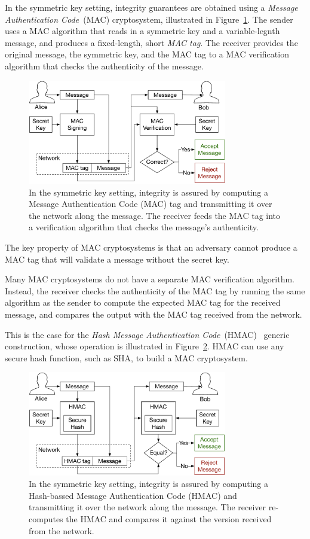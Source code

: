 In the symmetric key setting, integrity guarantees are obtained using a
\textit{Message Authentication Code}~(MAC) cryptosystem, illustrated in
Figure~\ref{fig:symmetric_mac}. The sender uses a MAC algorithm that reads in a
symmetric key and a variable-legnth message, and produces a fixed-length, short
\textit{MAC tag}. The receiver provides the original message, the symmetric
key, and the MAC tag to a MAC verification algorithm that checks the
authenticity of the message.

\begin{figure}[hbt]
  \centering
  \includegraphics[width=87mm]{figures/symmetric_mac.pdf}
  \caption{
    In the symmetric key setting, integrity is assured by computing a
    Message Authentication Code (MAC) tag and transmitting it over the network
    along the message. The receiver feeds the MAC tag into a verification
    algorithm that checks the message's authenticity.
  }
  \label{fig:symmetric_mac}
\end{figure}

The key property of MAC cryptosystems is that an adversary cannot produce a
MAC tag that will validate a message without the secret key.

Many MAC cryptosystems do not have a separate MAC verification algorithm.
Instead, the receiver checks the authenticity of the MAC tag by running the
same algorithm as the sender to compute the expected MAC tag for the received
message, and compares the output with the MAC tag received from the network.

This is the case for the
\textit{Hash Message Authentication Code}~(HMAC)~\cite{krawczyk1997hmac}
generic construction, whose operation is illustrated in
Figure~\ref{fig:symmetric_hmac}. HMAC can use any secure hash function, such as
SHA, to build a MAC cryptosystem.

\begin{figure}[hbt]
  \centering
  \includegraphics[width=87mm]{figures/symmetric_hmac.pdf}
  \caption{
    In the symmetric key setting, integrity is assured by computing a
    Hash-bassed Message Authentication Code (HMAC) and transmitting it over the
    network along the message. The receiver re-computes the HMAC and compares
    it against the version received from the network.
  }
  \label{fig:symmetric_hmac}
\end{figure}

